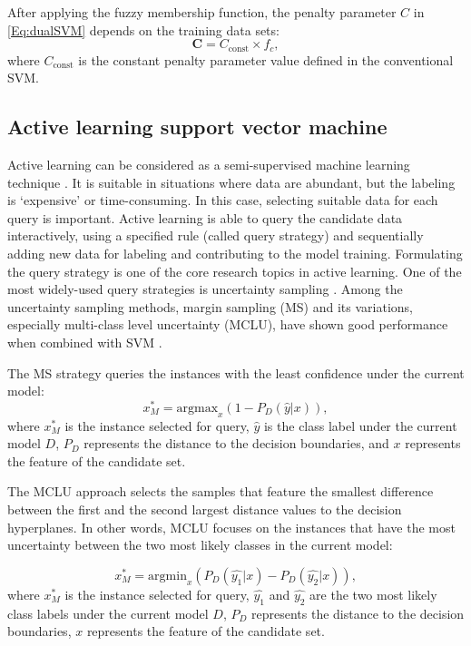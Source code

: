 After applying the fuzzy membership function, the penalty parameter $C$ in \eqref{Eq:dualSVM} depends on the training data sets: 
\begin{equation}
\mathbf{C} = C_{\text{const}} \times f_c,
\end{equation}
where $C_{\text{const}}$ is the constant penalty parameter value defined in the conventional SVM.

\subsection{Active learning support vector machine}
\label{subsec:chap2:active_learning}
Active learning can be considered as a semi-supervised machine learning technique \cite{calma2015new}. 
It is suitable in situations where data are abundant, but the labeling is ‘expensive’ or time-consuming. In this case, selecting suitable data for each query is important.
Active learning is able to query the candidate data interactively, using a specified rule (called query strategy) and sequentially adding new data for labeling and contributing to the model training. 
Formulating the query strategy is one of the core research topics in active learning. One of the most widely-used query strategies is uncertainty sampling \cite{tuia2011survey}. Among the uncertainty sampling methods, margin sampling (MS) and its variations, especially multi-class level uncertainty (MCLU), have shown good performance when combined with SVM \cite{tuia2011survey}.

The MS strategy queries the instances with the least confidence under the current model:
\begin{equation}
\label{eq:MS}
x^*_M = \text{argmax}_x ( 1 - P_{D}(\hat{y} | x) ),
\end{equation}
where $x^*_M$ is the instance selected for query,  $\hat{y}$ is the class label under the current model $D$, $P_{D}$ represents the distance to the decision boundaries, and $x$ represents the feature of the candidate set.
 
The MCLU approach selects the samples that feature the smallest difference between the first and the second largest distance values to the decision hyperplanes. In other words,  MCLU focuses on the instances that have the most uncertainty between the two most likely classes in the current model:

\begin{equation}
\label{eq:MCLU}
x^*_M = \text{argmin}_x ( P_{D}(\hat{y_1} | x) - P_{D}(\hat{y_2} | x) ),
\end{equation}
where $x^*_M$ is the instance selected for query, $\hat{y_1}$ and $\hat{y_2}$ are the two most likely class labels under the current model $D$, $P_{D}$ represents the distance to the decision boundaries, $x$ represents the feature of the candidate set.

